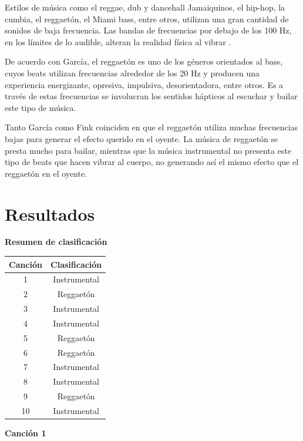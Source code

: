 \documentclass[12pt, letterpaper]{article}
\begin{document}
Estilos de música como el reggae, dub y dancehall Jamaiquinos, el hip-hop, la cumbia,
el reggaetón, el Miami bass, entre otros, utilizan una gran cantidad de sonidos de baja
frecuencia. Las bandas de frecuencias por debajo de los 100 Hz, en los límites
de lo audible, alteran la realidad física al vibrar \cite{fink-2018}.

De acuerdo con García\cite{Garcia-2016}, el reggaetón es uno de los géneros orientados al
bass, cuyos beats utilizan frecuencias alrededor de los 20 Hz y producen una experiencia
energizante, opresiva, impulsiva, desorientadora, entre otros. Es a través de estas
frecuencias se involucran los sentidos hápticos al escuchar y bailar este tipo de música.

Tanto García\cite{Garcia-2016} como Fink\cite{fink-2018} coinciden en que el reggaetón
utiliza muchas frecuencias bajas para generar el efecto querido en el oyente. La música
de reggaetón se presta mucho para bailar, mientras que la música instrumental no presenta
este tipo de beats que hacen vibrar al cuerpo, no generando así el mismo efecto
que el reggaetón en el oyente.

\newpage
\section{Resultados}

\textbf{\large{Resumen de clasificación}} \bigskip \\

\begin{tabular}{| c | c |}
  \hline
  Canción & Clasificación \\ \hline
  1 & Instrumental \\
  2 & Reggaetón \\
  3 & Instrumental \\
  4 & Instrumental \\
  5 & Reggaetón \\
  6 & Reggaetón \\
  7 & Instrumental \\
  8 & Instrumental \\
  9 & Reggaetón \\
  10 & Instrumental \\ \hline
\end{tabular}

\newpage
\textbf{\large{Canción 1}}
\end{document}
